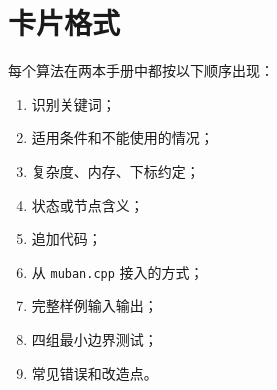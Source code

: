 \section{卡片格式}

每个算法在两本手册中都按以下顺序出现：

\begin{enumerate}
\item 识别关键词；
\item 适用条件和不能使用的情况；
\item 复杂度、内存、下标约定；
\item 状态或节点含义；
\item 追加代码；
\item 从 \texttt{muban.cpp} 接入的方式；
\item 完整样例输入输出；
\item 四组最小边界测试；
\item 常见错误和改造点。
\end{enumerate}
